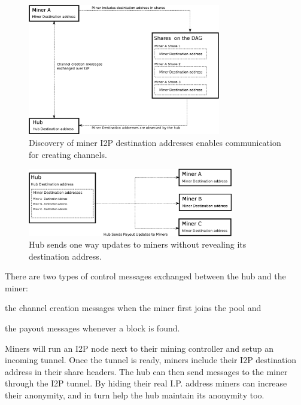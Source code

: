 \documentclass{article}
\begin{document}
\begin{figure}
  \begin{center}
    \includegraphics[width=0.75\textwidth]{new-miner-communication.eps}
    \caption{Discovery of miner I2P destination addresses enables
      communication for creating channels.}\label{fig:new-miner-communication}
  \end{center}
\end{figure}

\begin{figure}
  \begin{center}
    \includegraphics[width=0.8\textwidth]{payout-communication.eps}
    \caption{Hub sends one way updates to miners without revealing its
      destination address.}\label{fig:new-miner-communication}
  \end{center}
\end{figure}

There are two types of control messages exchanged between the hub and
the miner: 
\begin{enumerate*}
\item the channel creation messages when the miner first joins the
  pool and
\item the payout messages whenever a block is found.
\end{enumerate*}

Miners will run an I2P node next to their mining controller and setup
an incoming tunnel. Once the tunnel is ready, miners include their I2P
destination address in their share headers. The hub can then send
messages to the miner through the I2P tunnel. By hiding their real
I.P. address miners can increase their anonymity, and in turn help the
hub maintain its anonymity too.
\end{document}
